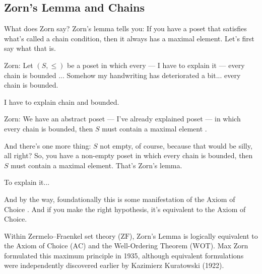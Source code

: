 \subsection{Zorn's Lemma and Chains}

\begin{speech}[00:36:33 - 00:38:18]
What does Zorn say? Zorn's lemma tells you: If you have a poset that satisfies what's called a chain condition, then it always has a maximal element. Let's first say what that is.

Zorn: Let $(S, \le)$ be a poset in which every --- I have to explain it --- every chain is bounded ... Somehow my handwriting has deteriorated a bit... every chain is bounded.

I have to explain chain and bounded.

Zorn: We have an abstract poset --- I've already explained poset --- in which every chain is bounded, then $S$ must contain a maximal element .

And there's one more thing: $S$ not empty, of course, because that would be silly, all right?  So, you have a non-empty poset in which every chain is bounded, then $S$ must contain a maximal element. That's Zorn's lemma.

To explain it...

And by the way, foundationally this is some manifestation of the Axiom of Choice . And if you make the right hypothesis, it's equivalent to the Axiom of Choice.
\end{speech}

\begin{content}
\end{content}

\begin{aiNote}
Within Zermelo--Fraenkel set theory ($\text{ZF}$), Zorn's Lemma is logically equivalent to the Axiom of Choice ($\text{AC}$) and the Well-Ordering Theorem ($\text{WOT}$). Max Zorn formulated this maximum principle in 1935, although equivalent formulations were independently discovered earlier by Kazimierz Kuratowski (1922).
\end{aiNote}

